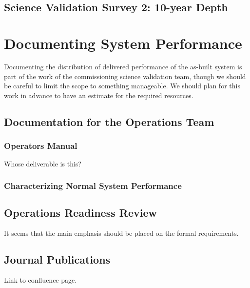 \documentclass[DM,lsstdraft,toc]{lsstdoc}
\begin{document}
\subsection{Science Validation Survey 2: 10-year Depth}

\section{Documenting System Performance}

Documenting the distribution of delivered performance of the as-built system is part of the work of the commissioning science validation team, though we should be careful to limit the scope to something manageable.
We should plan for this work in advance to have an estimate for the required resources.

\subsection{Documentation for the Operations Team}

\subsubsection{Operators Manual}

Whose deliverable is this?

\subsubsection{Characterizing Normal System Performance}

\subsection{Operations Readiness Review}

It seems that the main emphasis should be placed on the formal requirements.

\subsection{Journal Publications}

Link to confluence page.



\end{document}
